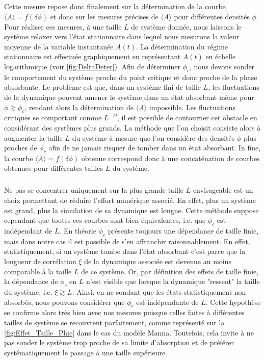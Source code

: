 \subparagraph{}Cette mesure repose donc finalement sur la détermination de la courbe $\langle A \rangle = f(\delta\phi)$ et donc sur les mesures précises de $\langle A \rangle$ pour différentes densités $\phi$. Pour réaliser ces mesures, à une taille $L$ de système donnée, nous laissons le système relaxer vers l'état stationnaire dans lequel nous mesurons la valeur moyenne de la variable instantanée $A(t)$. La détermination du régime stationnaire est effectuée graphiquement en représentant $A(t)$ en échelle logarithmique (voir \autoref{fig:DeltaDeter}). Afin de déterminer $\phi_c$, nous devons sonder le comportement du système proche du point critique et donc proche de la phase absorbante. Le problème est que, dans un système fini de taille $L$, les fluctuations de la dynamique peuvent amener le système dans un état absorbant même pour $\phi \gtrsim \phi_c$, rendant alors la détermination de $\langle A \rangle$ impossible. Les fluctuations critiques se comportant comme $L^{-D}$, il est possible de contourner cet obstacle en considérant des systèmes plus grands. La méthode que l'on choisit consiste alors à augmenter la taille $L$ du système à mesure que l'on considère des densités $\phi$ plus proches de $\phi_c$ afin de ne jamais risquer de tomber dans un état absorbant. In fine, la courbe $\langle A \rangle = f(\delta\phi)$ obtenue correspond donc  à une concaténation de courbes obtenues pour différentes tailles $L$ du système.

\subparagraph{}Ne pas se concentrer uniquement sur la plus grande taille $L$ envisageable est un choix permettant de réduire l'effort numérique associé. En effet, plus un système est grand, plus la simulation de sa dynamique est longue. Cette méthode suppose cependant que toutes ces courbes sont bien équivalentes, i.e. que $\phi_c$ est indépendant de $L$. En théorie $\phi_c$ présente toujours une dépendance de taille finie, mais dans notre cas il est possible de s'en affranchir raisonnablement. En effet, statistiquement, si un système tombe dans l'état absorbant c'est parce que la longueur de corrélation $\xi$ de la dynamique associée est devenue au moins comparable à la taille $L$ de ce système. Or, par définition des effets de taille finie, la dépendance de $\phi_c$ en $L$ n'est visible que lorsque la dynamique "ressent" la taille du système, i.e. $\xi \gtrsim L$. Ainsi, en ne sondant que les états statistiquement non absorbés, nous pouvons considérer que $\phi_c$ est indépendante de $L$. Cette hypothèse se confirme alors très bien avec nos mesures puisque celles faites à différentes tailles de système se recouvrent parfaitement, comme représenté sur la \autoref{fig:Effet_Taille_Phic} dans le cas du modèle Manna. Toutefois, cela invite à ne pas sonder le système trop proche de sa limite d'absorption et de préférer systématiquement le passage à une taille supérieure.

